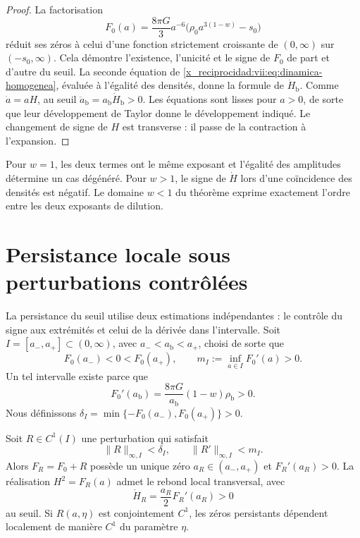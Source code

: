 \begin{proof}
La factorisation
\[
 F_0(a)=\frac{8\pi G}{3}a^{-6}
             \bigl(\rho_0a^{3(1-w)}-s_0\bigr)
\]
réduit ses zéros à celui d'une fonction strictement croissante de
\((0,\infty)\) sur \((-s_0,\infty)\). Cela démontre l'existence,
l'unicité et le signe de \(F_0\) de part et d'autre du seuil.
La seconde équation de \eqref{x_reciprocidad:vii:eq:dinamica-homogenea}, évaluée
à l'égalité des densités, donne la formule de \(\dot H_{\mathrm b}\).
Comme \(\dot a=aH\), au seuil
\(\ddot a_{\mathrm b}=a_{\mathrm b}\dot H_{\mathrm b}>0\).
Les équations sont lisses pour \(a>0\), de sorte que leur développement de
Taylor donne le développement indiqué. Le changement de signe de \(H\) est
transverse : il passe de la contraction à l'expansion.
\end{proof}

Pour \(w=1\), les deux termes ont le même exposant et l'égalité des
amplitudes détermine un cas dégénéré. Pour \(w>1\), le signe de
\(\dot H\) lors d'une coïncidence des densités est négatif.
Le domaine \(w<1\) du théorème exprime exactement l'ordre entre les
deux exposants de dilution.

\section{Persistance locale sous perturbations contrôlées}
\label{x_reciprocidad:vii:sec:persistencia}

La persistance du seuil utilise deux estimations indépendantes : le contrôle du signe aux extrémités et celui de la dérivée dans l'intervalle. Soit \(I=[a_-,a_+]\subset(0,\infty)\), avec \(a_-<a_{\mathrm b}<a_+\), choisi de sorte que
\[
 F_0(a_-)<0<F_0(a_+),\qquad
 m_I:=\inf_{a\in I}F_0'(a)>0.
\]
Un tel intervalle existe parce que
\[
 F_0'(a_{\mathrm b})
   =\frac{8\pi G}{a_{\mathrm b}}(1-w)\rho_{\mathrm b}>0.
\]
Nous définissons
\(\delta_I=\min\{-F_0(a_-),F_0(a_+)\}>0\).

\begin{theorem}
\label{x_reciprocidad:vii:thm:persistencia}
Soit \(R\in C^1(I)\) une perturbation qui satisfait
\[
 \|R\|_{\infty,I}<\delta_I,\qquad
 \|R'\|_{\infty,I}<m_I.
\]
Alors \(F_R=F_0+R\) possède un unique zéro \(a_R\in(a_-,a_+)\) et \(F_R'(a_R)>0\). La réalisation \(H^2=F_R(a)\) admet le rebond local transversal, avec
\[
 \dot H_R=\frac{a_R}{2}F_R'(a_R)>0
\]
au seuil. Si \(R(a,\eta)\) est conjointement \(C^1\), les zéros
persistants dépendent localement de manière \(C^1\) du paramètre \(\eta\).
\end{theorem}

